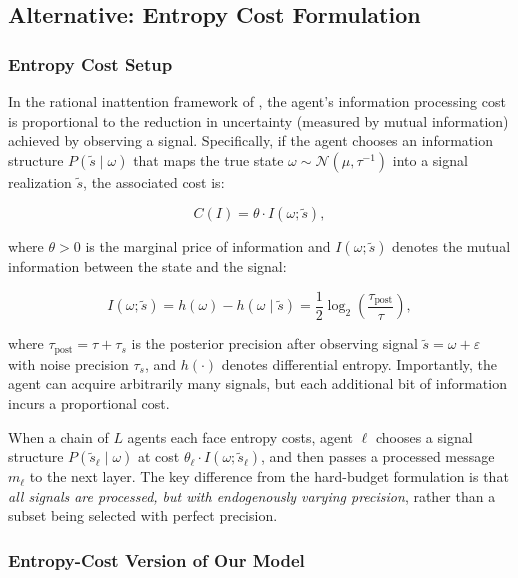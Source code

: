 \subsection{Alternative: Entropy Cost Formulation}
\label{sec:entropy_cost}

\subsubsection{Entropy Cost Setup}

In the rational inattention framework of \citet{sims2003implications}, the agent's information processing cost is proportional to the reduction in uncertainty (measured by mutual information) achieved by observing a signal. Specifically, if the agent chooses an information structure $P(\tilde{s} \mid \omega)$ that maps the true state $\omega \sim \mathcal{N}(\mu, \tau^{-1})$ into a signal realization $\tilde{s}$, the associated cost is:

\begin{equation}
    C(I) = \theta \cdot I(\omega; \tilde{s}),
\end{equation}

where $\theta > 0$ is the marginal price of information and $I(\omega; \tilde{s})$ denotes the mutual information between the state and the signal:

\begin{equation}
    I(\omega; \tilde{s}) = h(\omega) - h(\omega \mid \tilde{s}) = \frac{1}{2}\log_2\left(\frac{\tau_{\text{post}}}{\tau}\right),
\end{equation}

where $\tau_{\text{post}} = \tau + \tau_s$ is the posterior precision after observing signal $\tilde{s} = \omega + \varepsilon$ with noise precision $\tau_s$, and $h(\cdot)$ denotes differential entropy. Importantly, the agent can acquire arbitrarily many signals, but each additional bit of information incurs a proportional cost.

When a chain of $L$ agents each face entropy costs, agent $\ell$ chooses a signal structure $P(\tilde{s}_\ell \mid \omega)$ at cost $\theta_\ell \cdot I(\omega; \tilde{s}_\ell)$, and then passes a processed message $m_\ell$ to the next layer. The key difference from the hard-budget formulation is that \emph{all signals are processed, but with endogenously varying precision}, rather than a subset being selected with perfect precision.

\subsubsection{Entropy-Cost Version of Our Model}

